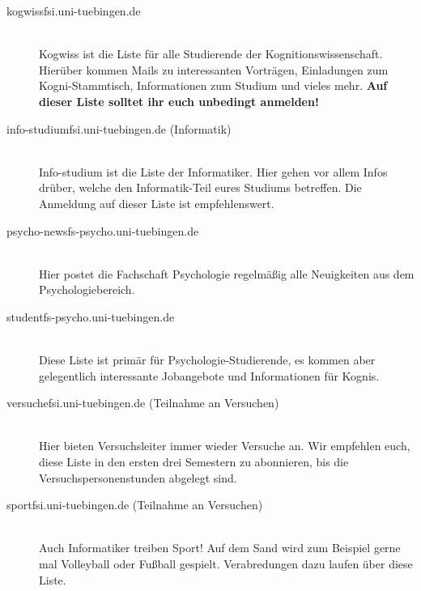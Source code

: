 \begin{description}

  \item[kogwiss\At fsi.uni-tuebingen.de] ~\\
    Kogwiss ist die Liste für alle Studierende der Kognitionswissenschaft. Hierüber kommen Mails zu interessanten Vorträgen, Einladungen zum Kogni-Stammtisch, Informationen zum Studium und vieles mehr. \textbf{Auf dieser Liste solltet ihr euch unbedingt anmelden!}

    
\item[info-studium\At fsi.uni-tuebingen.de (Informatik)] ~\\
	  Info-studium ist die Liste der Informatiker. Hier gehen vor allem Infos drüber, welche den Informatik-Teil eures Studiums betreffen. Die Anmeldung auf dieser Liste ist empfehlenswert.
	  
    
\item[psycho-news\At fs-psycho.uni-tuebingen.de] ~\\
    Hier postet die Fachschaft Psychologie regelmäßig alle Neuigkeiten aus dem Psychologiebereich.  

    
    
\item[student\At fs-psycho.uni-tuebingen.de] ~\\
    Diese Liste ist primär für Psychologie-Studierende, es kommen aber gelegentlich interessante Jobangebote und Informationen für Kognis. 


    
  \item[versuche\At fsi.uni-tuebingen.de (Teilnahme an Versuchen)] ~\\
	 Hier bieten Versuchsleiter immer wieder Versuche an. Wir empfehlen euch, diese Liste in den ersten drei Semestern zu abonnieren, bis die Versuchspersonenstunden abgelegt sind.
  
  
    \item[sport\At fsi.uni-tuebingen.de (Teilnahme an Versuchen)] ~\\
Auch Informatiker treiben Sport! Auf dem Sand wird zum Beispiel gerne mal Volleyball oder Fußball gespielt. Verabredungen dazu laufen über diese Liste.
  
  

\end{description}
